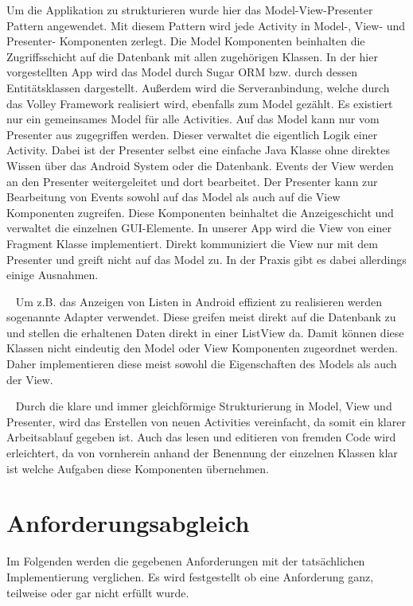 \documentclass{scrartcl}
\begin{document}
\noindent
Um die Applikation zu strukturieren wurde hier das Model-View-Presenter Pattern
angewendet. Mit diesem Pattern wird jede Activity in Model-, View- und
Presenter- Komponenten zerlegt. Die Model Komponenten beinhalten die
Zugriffsschicht auf die Datenbank mit allen zugehörigen Klassen. In der hier
vorgestellten App wird das Model durch Sugar ORM bzw. durch dessen
Entitätsklassen dargestellt. Außerdem wird die Serveranbindung, welche durch das
Volley Framework realisiert wird, ebenfalls zum Model gezählt. Es existiert
nur ein gemeinsames Model für alle Activities. Auf das Model kann nur vom
Presenter aus zugegriffen werden. Dieser verwaltet die
eigentlich Logik einer Activity. Dabei ist der Presenter selbst eine einfache
Java Klasse ohne direktes Wissen über das Android System oder die Datenbank.
Events der View werden an den Presenter weitergeleitet und dort bearbeitet. Der
Presenter kann zur Bearbeitung von Events sowohl auf das Model als auch auf die
View Komponenten zugreifen. Diese Komponenten beinhaltet die Anzeigeschicht und
verwaltet die einzelnen GUI-Elemente. In unserer App wird die View von einer
Fragment Klasse implementiert. Direkt kommuniziert die View nur mit dem
Presenter und greift nicht auf das Model zu. In der Praxis gibt es dabei
allerdings einige Ausnahmen.

\ \newline
Um z.B. das Anzeigen von Listen in Android effizient zu realisieren werden
sogenannte Adapter verwendet. Diese greifen meist direkt auf die Datenbank zu
und stellen die erhaltenen Daten direkt in einer ListView da. Damit können diese
Klassen nicht eindeutig den Model oder View Komponenten zugeordnet werden. Daher
implementieren diese meist sowohl die Eigenschaften des Models als auch der
View.

\ \newline
Durch die klare und immer gleichförmige Strukturierung in Model, View und
Presenter, wird das Erstellen von neuen Activities vereinfacht, da somit ein
klarer Arbeitsablauf gegeben ist. Auch das lesen und editieren von fremden Code
wird erleichtert, da von vornherein anhand der Benennung der einzelnen Klassen
klar ist welche Aufgaben diese Komponenten übernehmen.

\section{Anforderungsabgleich}

Im Folgenden werden die gegebenen Anforderungen mit der tatsächlichen
Implementierung verglichen. Es wird festgestellt ob eine Anforderung ganz,
teilweise oder gar nicht erfüllt wurde.
\end{document}
